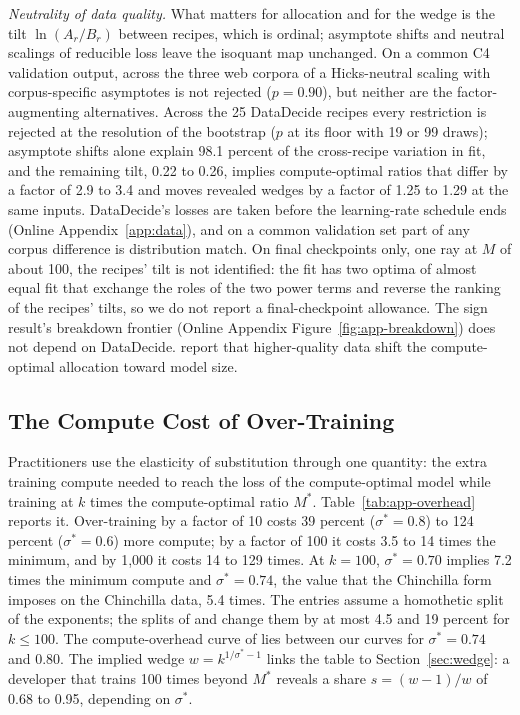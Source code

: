 \textit{Neutrality of data quality.} What matters for allocation and for the wedge is the tilt $\ln(A_r/B_r)$ between
recipes, which is ordinal; asymptote shifts and neutral scalings of reducible loss leave the isoquant map unchanged. On a
common C4 validation output, across the three web corpora of \citet{gadre2024language} a Hicks-neutral scaling with
corpus-specific asymptotes is not rejected ($p=0.90$), but neither are the factor-augmenting alternatives. Across the 25
DataDecide recipes \citep{magnusson2025datadecide} every restriction is rejected at the resolution of the bootstrap
($p$ at its floor with 19 or 99 draws); asymptote shifts alone explain 98.1 percent of the cross-recipe variation in fit,
and the remaining tilt, 0.22 to 0.26, implies compute-optimal ratios that differ by a factor of 2.9 to 3.4 and moves
revealed wedges by a factor of 1.25 to 1.29 at the same inputs. DataDecide's losses are taken before the learning-rate
schedule ends (Online Appendix~\ref{app:data}), and on a common validation set part of any corpus difference is
distribution match. On final checkpoints only, one ray at $M$ of about 100, the recipes' tilt is not identified: the fit
has two optima of almost equal fit that exchange the roles of the two power terms and reverse the ranking of the
recipes' tilts, so we do not report a final-checkpoint allowance. The sign result's breakdown frontier (Online Appendix
Figure~\ref{fig:app-breakdown}) does not depend on DataDecide. \citet{bi2024deepseek} report that higher-quality data
shift the compute-optimal allocation toward model size.



\subsection{The Compute Cost of Over-Training}\label{app:add-overhead}

Practitioners use the elasticity of substitution through one quantity: the extra training compute needed to reach the
loss of the compute-optimal model while training at $k$ times the compute-optimal ratio $M^*$. Table~\ref{tab:app-overhead}
reports it. Over-training by a factor of 10 costs 39 percent ($\sigma^*=0.8$) to 124 percent ($\sigma^*=0.6$) more
compute; by a factor of 100 it costs 3.5 to 14 times the minimum, and by 1,000 it costs 14 to 129 times. At $k=100$,
$\sigma^*=0.70$ implies 7.2 times the minimum compute and $\sigma^*=0.74$, the value that the Chinchilla form imposes on
the Chinchilla data, 5.4 times. The entries assume a homothetic split of the exponents; the splits of
\citet{besiroglu2024chinchilla} and \citet{hoffmann2022training} change them by at most 4.5 and 19 percent for $k\le100$.
The compute-overhead curve of \citet{devries2023go} lies between our curves for $\sigma^*=0.74$ and 0.80. The implied
wedge $w=k^{1/\sigma^*-1}$ links the table to Section~\ref{sec:wedge}: a developer that trains 100 times beyond $M^*$
reveals a share $s=(w-1)/w$ of 0.68 to 0.95, depending on $\sigma^*$.

